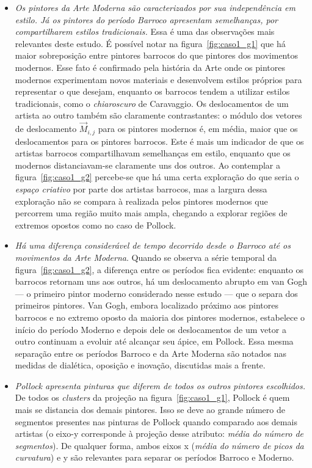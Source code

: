 \begin{itemize}
  \item \textit{Os pintores da Arte Moderna são caracterizados por sua
    independência em estilo. Já os pintores do período Barroco
    apresentam semelhanças, por compartilharem estilos tradicionais.}
    Essa é uma das observações mais relevantes deste estudo. É
    possível notar na figura~\ref{fig:caso1_g1} que há maior
    sobreposição entre pintores barrocos do que pintores dos
    movimentos modernos. Esse fato é confirmado pela história da Arte
    onde os pintores modernos experimentam novos materiais e
    desenvolvem estilos próprios para representar o que desejam,
    enquanto os barrocos tendem a utilizar estilos tradicionais, como
    o \textit{chiaroscuro} de Caravaggio. Os deslocamentos de um
    artista ao outro também são claramente contrastantes: o módulo dos
    vetores de deslocamento $\vec{M}_{i,j}$ para os pintores modernos
    é, em média, maior que os deslocamentos para os pintores
    barrocos. Este é mais um indicador de que os artistas barrocos
    compartilhavam semelhanças em estilo, enquanto que os modernos
    distanciavam-se claramente uns dos outros. Ao contemplar a
    figura~\ref{fig:caso1_g2} percebe-se que há uma certa exploração
    do que seria o \textit{espaço criativo} por parte dos artistas
    barrocos, mas a largura dessa exploração não se compara à
    realizada pelos pintores modernos que percorrem uma região muito
    mais ampla, chegando a explorar regiões de extremos opostos como
    no caso de Pollock.

\item \textit{Há uma diferença considerável de tempo decorrido desde o
  Barroco até os movimentos da Arte Moderna}. Quando se observa a
  série temporal da figura~\ref{fig:caso1_g2}, a diferença entre os
  períodos fica evidente: enquanto os barrocos retornam uns aos
  outros, há um deslocamento abrupto em van Gogh --- o primeiro pintor
  moderno considerado nesse estudo --- que o separa dos primeiros
  pintores. Van Gogh, embora localizado próximo aos pintores barrocos
  e no extremo oposto da maioria dos pintores modernos, estabelece o
  início do período Moderno e depois dele os deslocamentos de um vetor
  a outro continuam a evoluir até alcançar seu ápice, em Pollock. Essa
  mesma separação entre os períodos Barroco e da Arte Moderna são
  notados nas medidas de dialética, oposição e inovação, discutidas
  mais a frente.

  \item \textit{Pollock apresenta pinturas que diferem de todos os
    outros pintores escolhidos.} De todos os \textit{clusters} da
    projeção na figura~\ref{fig:caso1_g1}, Pollock é quem mais se
    distancia dos demais pintores. Isso se deve ao grande número de
    segmentos presentes nas pinturas de Pollock quando comparado aos
    demais artistas (o eixo-y corresponde à projeção desse atributo:
    \emph{média do número de segmentos}). De qualquer forma, ambos
    eixos x (\emph{média do número de picos da curvatura}) e y são
    relevantes para separar os períodos Barroco e Moderno.


\end{itemize}

